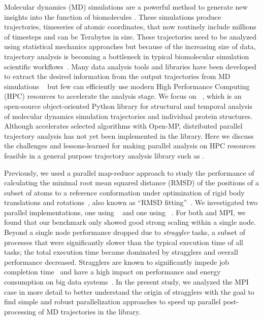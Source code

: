 \label{sec:introduction}
Molecular dynamics (MD) simulations are a powerful method to generate new insights into the function of biomolecules \citep{Borhani:2012mi, Dror:2012cr, Orozco:2014dq, Perilla:2015kx, Bottaro:2018aa}.
These simulations produce trajectories, timeseries of atomic coordinates, that now routinely include millions of timesteps and can be Terabytes in size.
These trajectories need to be analyzed using statistical mechanics approaches \cite{Mura:2014kx} but because of the increasing size of data, trajectory analysis is becoming a bottleneck in typical biomolecular simulation scientific workflows~\cite{Cheatham:2015}.
Many data analysis tools and libraries have been developed to extract the desired information from the output trajectories from MD simulations ~\cite{nmoldyn, nmoldyn-2012, Hum96, Hinsen:2000kx, Grant:2006ud, himach-2008, Romo:2009zr, Romo:2014bh, Michaud-Agrawal:2011fu, Gowers:2016aa, cpptraj-2013, mdtraj-2015, pteros2015, Doerr:2016aa} but few can efficiently use modern High Performance Computing (HPC) resources to accelerate the analysis stage.
We focus on ~\citep{Gowers:2016aa,Michaud-Agrawal:2011fu}, which is an open-source object-oriented Python library for structural and temporal analysis of molecular dynamics simulation trajectories and individual protein structures.
Although  accelerates selected algorithms with Open-MP, distributed parallel trajectory analysis has not yet been implemented in the library.
Here we discuss the challenges and lessons-learned for making parallel analysis on HPC resources feasible in a general purpose trajectory analysis library such as .

Previously, we used a parallel map-reduce approach to study the performance of calculating the minimal root mean squared distance (RMSD) of the positions of a subset of atoms to a reference conformation under optimization of rigid body translations and rotations~\cite{Khoshlessan:2017ab, ICCP-2018}, also known as ``RMSD fitting''~\cite{Liu:2010kx, Mura:2014kx}. 
We investigated two parallel implementations, one using ~\cite{Rocklin:2015aa} and one using ~\cite{Dalcin:2011aa, Dalcin:2005aa}. 
For both  and MPI, we found that our benchmark only showed good strong scaling within a single node.
Beyond a single node performance dropped due to \emph{straggler} tasks, a subset of processes that were significantly slower than the typical execution time of all tasks; the total execution time became dominated by stragglers and overall performance decreased.
Stragglers are known to significantly impede job completion time~\cite{Garraghan2016} and have a high impact on performance and energy consumption on big data systems~\cite{Tien-2017}.
In the present study, we analyzed the MPI case in more detail to better understand the origin of stragglers with the goal to find simple and robust parallelization approaches to speed up parallel post-processing of MD trajectories in the  library.

